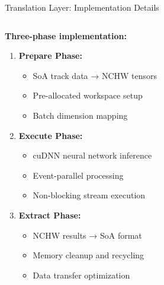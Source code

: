 \documentclass[10pt,aspectratio=169]{beamer}
\begin{document}
\begin{frame}{Translation Layer: Implementation Details}
  \begin{columns}[T]
    \begin{column}{0.48\textwidth}
      \textbf{Three-phase implementation:}
      \begin{enumerate}
        \item \textbf{Prepare Phase:}
           \begin{itemize}
             \item SoA track data → NCHW tensors
             \item Pre-allocated workspace setup
             \item Batch dimension mapping
           \end{itemize}
        \item \textbf{Execute Phase:}
           \begin{itemize}
             \item cuDNN neural network inference
             \item Event-parallel processing
             \item Non-blocking stream execution
           \end{itemize}
        \item \textbf{Extract Phase:}
           \begin{itemize}
             \item NCHW results → SoA format
             \item Memory cleanup and recycling
             \item Data transfer optimization
           \end{itemize}
      \end{enumerate}
    \end{column}
    
    \begin{column}{0.5\textwidth}
      \begin{center}
\end{center}
\end{column}
\end{columns}
\end{frame}
\end{document}

